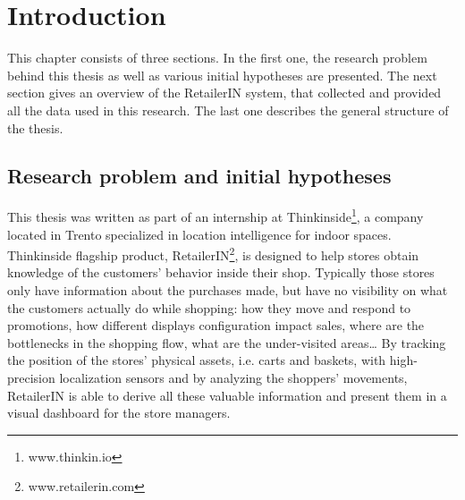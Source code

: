 \chapter{Introduction}
\label{cha:introduction}

This chapter consists of three sections. In the first one, the research problem behind this thesis as well as various initial hypotheses are presented. The next section gives an overview of the RetailerIN system, that collected and provided all the data used in this research. The last one describes the general structure of the thesis.

\section{Research problem and initial hypotheses}
\label{sec:research_problem_and_initial_hypoteses}

This thesis was written as part of an internship at Thinkinside\footnote{www.thinkin.io}, a company located in Trento specialized in location intelligence for indoor spaces. Thinkinside flagship product, RetailerIN\footnote{www.retailerin.com}, is designed to help stores obtain knowledge of the customers’ behavior inside their shop. Typically those stores only have information about the purchases made, but have no visibility on what the customers actually do while shopping: how they move and respond to promotions, how different displays configuration impact sales, where are the bottlenecks in the shopping flow, what are the under-visited areas… By tracking the position of the stores’ physical assets, i.e. carts and baskets, with high-precision localization sensors and by analyzing the shoppers’ movements, RetailerIN is able to derive all these valuable information and present them in a visual dashboard for the store managers.

